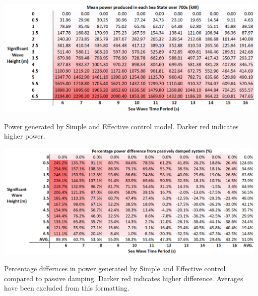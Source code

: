 \documentclass{report}
\begin{document}
\begin{table}
\hspace{-3cm}
\includegraphics[scale=0.7]{tables/SaEResults}
\caption{Power generated by Simple and Effective control model. Darker red indicates higher power.}
\label{SAEResults}
\end{table}

\begin{table}
\hspace{-3cm}
\includegraphics[scale=0.7]{tables/SaEPercent}
\caption{Percentage differnces in power generated by Simple and Effective control compared to passive damping. Darker red indicates higher difference. Averages have been excluded from this formatting.}
\label{SAEPercents}
\end{table}
\end{document}
